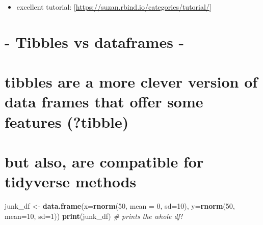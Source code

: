 \documentclass[]{article}
\newenvironment{Shaded}{\begin{snugshade}}{\end{snugshade}}
\newcommand{\CommentTok}[1]{\textcolor[rgb]{0.56,0.35,0.01}{\textit{#1}}}
\newcommand{\DataTypeTok}[1]{\textcolor[rgb]{0.13,0.29,0.53}{#1}}
\newcommand{\DecValTok}[1]{\textcolor[rgb]{0.00,0.00,0.81}{#1}}
\newcommand{\KeywordTok}[1]{\textcolor[rgb]{0.13,0.29,0.53}{\textbf{#1}}}
\newcommand{\NormalTok}[1]{#1}
\newcommand{\StringTok}[1]{\textcolor[rgb]{0.31,0.60,0.02}{#1}}
\providecommand{\tightlist}{%
  \setlength{\itemsep}{0pt}\setlength{\parskip}{0pt}}
\begin{document}
\begin{itemize}
\tightlist
\item
  excellent tutorial:
  {[}\url{https://suzan.rbind.io/categories/tutorial/}{]}
\end{itemize}

\hypertarget{tibbles-vs-dataframes--}{%
\section{- Tibbles vs dataframes -}\label{tibbles-vs-dataframes--}}

\hypertarget{tibbles-are-a-more-clever-version-of-data-frames-that-offer-some-features-tibble}{%
\section{tibbles are a more clever version of data frames that offer
some features
(?tibble)}\label{tibbles-are-a-more-clever-version-of-data-frames-that-offer-some-features-tibble}}

\hypertarget{but-also-are-compatible-for-tidyverse-methods}{%
\section{but also, are compatible for tidyverse
methods}\label{but-also-are-compatible-for-tidyverse-methods}}

\begin{Shaded}
\begin{Highlighting}[]
\NormalTok{junk_df <-}\StringTok{ }\KeywordTok{data.frame}\NormalTok{(}\DataTypeTok{x=}\KeywordTok{rnorm}\NormalTok{(}\DecValTok{50}\NormalTok{, }\DataTypeTok{mean =} \DecValTok{0}\NormalTok{, }\DataTypeTok{sd=}\DecValTok{10}\NormalTok{), }
                   \DataTypeTok{y=}\KeywordTok{rnorm}\NormalTok{(}\DecValTok{50}\NormalTok{, }\DataTypeTok{mean=}\DecValTok{10}\NormalTok{, }\DataTypeTok{sd=}\DecValTok{1}\NormalTok{))}
\KeywordTok{print}\NormalTok{(junk_df) }\CommentTok{# prints the whole df!}
\end{Highlighting}
\end{Shaded}
\end{document}
